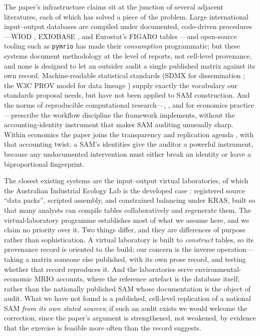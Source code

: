 The paper's infrastructure claims sit at the junction of several
adjacent literatures, each of which has solved a piece of the problem.
Large international input--output databases are compiled under documented,
code-driven procedures---WIOD \citep{timmer2015}, EXIOBASE
\citep{stadler2018}, and Eurostat's FIGARO tables \citep{remond2019}---and
open-source tooling such as \texttt{pymrio} \citep{stadler2021} has made
their \emph{consumption} programmatic; but these systems document
methodology at the level of reports, not cell-level provenance, and none
is designed to let an outsider audit a single published matrix against
its own record. Machine-readable statistical standards (SDMX for
dissemination \citep{sdmx2021}; the W3C PROV model for data lineage
\citep{w3cprov2013}) supply exactly the vocabulary our standards proposal
needs, but have not been applied to SAM construction. And the norms of
reproducible computational research---\citet{peng2011},
\citet{sandve2013}, and for economics practice
\citet{gentzkow2014}---prescribe the workflow discipline the framework
implements, without the accounting-identity instrument that makes SAM
auditing unusually sharp. Within economics the paper joins the
transparency and replication agenda \citep{christensen2018}, with that
accounting twist: a SAM's identities give the auditor a powerful
instrument, because any undocumented intervention must either break an
identity or leave a biproportional fingerprint.

The closest existing systems are the input--output virtual laboratories,
of which the Australian Industrial Ecology Lab is the developed case
\citep{lenzen2014}: registered source ``data packs'', scripted assembly,
and constrained balancing under KRAS, built so that many analysts can
compile tables collaboratively and regenerate them. The virtual-laboratory
programme establishes most of what we assume here, and we claim no
priority over it. Two things differ, and they are differences of purpose
rather than sophistication. A virtual laboratory is built to
\emph{construct} tables, so its provenance record is oriented to the
build; our concern is the inverse operation---taking a matrix someone
else published, with its own prose record, and testing whether that
record reproduces it. And the laboratories serve environmental-economic
MRIO accounts, where the reference artefact is the database itself,
rather than the nationally published SAM whose documentation is the
object of audit. What we have not found is a published, cell-level
replication of a national SAM \emph{from its own stated sources}; if such
an audit exists we would welcome the correction, since the paper's
argument is strengthened, not weakened, by evidence that the exercise is
feasible more often than the record suggests.

